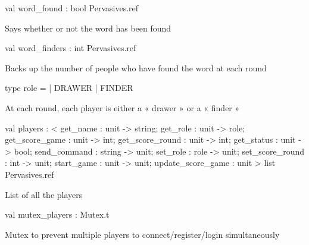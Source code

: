 \documentclass[11pt]{article}
\begin{document}
\label{val:Server.word-underscorefound}\begin{ocamldoccode}
val word_found : bool Pervasives.ref
\end{ocamldoccode}
\begin{ocamldocdescription}
Says whether or not the word has been found


\end{ocamldocdescription}




\label{val:Server.word-underscorefinders}\begin{ocamldoccode}
val word_finders : int Pervasives.ref
\end{ocamldoccode}
\begin{ocamldocdescription}
Backs up the number of people who have found the word at each round


\end{ocamldocdescription}




\label{type:Server.role}\begin{ocamldoccode}
type role =
  | DRAWER
  | FINDER
\end{ocamldoccode}
\begin{ocamldocdescription}
At each round, each player is either a « drawer » or a « finder »


\end{ocamldocdescription}




\label{val:Server.players}\begin{ocamldoccode}
val players :
  < get_name : unit -> string; get_role : unit -> role;
    get_score_game : unit -> int; get_score_round : unit -> int;
    get_status : unit -> bool; send_command : string -> unit;
    set_role : role -> unit; set_score_round : int -> unit;
    start_game : unit -> unit; update_score_game : unit >
  list Pervasives.ref
\end{ocamldoccode}
\begin{ocamldocdescription}
List of all the players


\end{ocamldocdescription}




\label{val:Server.mutex-underscoreplayers}\begin{ocamldoccode}
val mutex_players : Mutex.t
\end{ocamldoccode}
\begin{ocamldocdescription}
Mutex to prevent multiple players to connect/register/login simultaneously


\end{ocamldocdescription}
\end{document}
